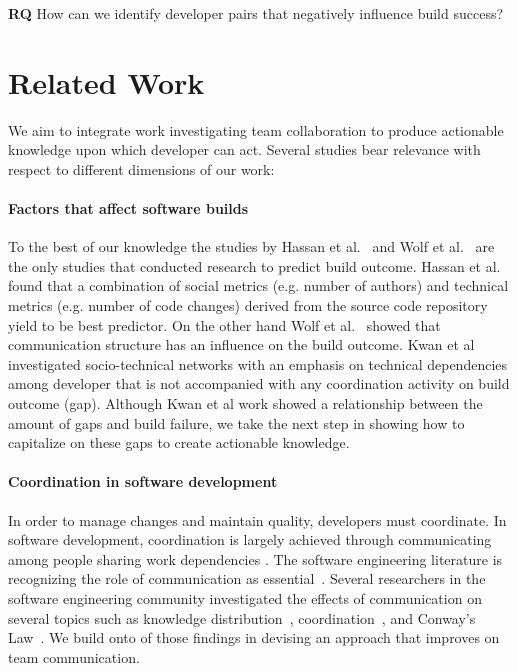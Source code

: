 \documentclass[conference]{IEEEtran}
\begin{document}
\textbf{RQ} How can we identify developer pairs that negatively influence build success?
 

\section{Related Work}
\label{sec:relwork}
We aim to integrate work investigating team collaboration to produce actionable knowledge upon which developer can act.
Several studies bear relevance with respect to different dimensions of our work:

\paragraph{Factors that affect software builds}
To the best of our knowledge the studies by Hassan et al.~\cite{hassan:ase:2006}
and Wolf et al.~\cite{wolf:icse:2009} are the only studies that conducted
research to predict build outcome. Hassan et al.~\cite{hassan:ase:2006} found
that a combination of social metrics (e.g. number of authors) and technical
metrics (e.g. number of code changes) derived from the source code repository
yield to be best predictor. 
On the other hand Wolf et al.~\cite{wolf:icse:2009} showed that communication structure has an influence on the build outcome.
Kwan et al~\cite{kwan:tse:2011} investigated socio-technical networks with an emphasis on technical dependencies among developer that is not accompanied with any coordination activity on build outcome (gap).
Although Kwan et al work showed a relationship between the amount of gaps and build failure, we take the next step in showing how to capitalize on these gaps to create actionable knowledge.

\paragraph{Coordination in software development}
In order to manage changes and maintain quality, developers must coordinate. In
software development, coordination is largely achieved through communicating among
people sharing work dependencies \cite{kraut1995:coordination}. The
software engineering literature is recognizing the role of communication as essential~\cite{nakakoji2010:rdc}.
Several researchers in the software engineering community investigated the effects of communication on several topics such as knowledge distribution~\cite{ehrlich:icgse:2006}, coordination~\cite{hinds:cscw:2006}, and Conway's Law~\cite{cataldo:cscw:2006}.
We build onto of those findings in devising an approach that improves on team communication.
\end{document}

